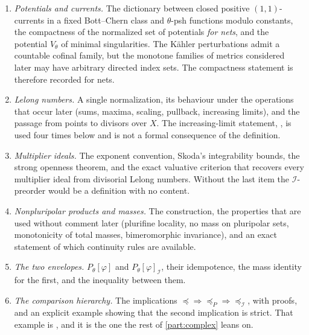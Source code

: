 \begin{enumerate}
\item\label{itm:ch51-need:currents}
      \emph{Potentials and currents.}  The dictionary between closed
      positive \((1,1)\)-currents in a fixed Bott--Chern class and
      \(\theta\)-psh functions modulo constants, the compactness of the
      normalized set of potentials \emph{for nets}, and the potential
      $V_\theta$ of minimal singularities. The K\"ahler perturbations
      admit a countable cofinal family, but the monotone families of
      metrics considered later may have arbitrary directed index sets.
      The compactness statement is therefore recorded for nets.
\item\label{itm:ch51-need:lelong}
      \emph{Lelong numbers.}  A single normalization, its behaviour under
      the operations that occur later (sums, maxima, scaling, pullback,
      increasing limits), and the passage from points to divisors over
      \(X\).  The increasing-limit statement,
      , is used four times below and is
      not a formal consequence of the definition.
\item\label{itm:ch51-need:ideals}
      \emph{Multiplier ideals.}  The exponent convention, Skoda's
      integrability bounds, the strong openness theorem, and the exact
      valuative criterion that recovers every multiplier ideal from
      divisorial Lelong numbers.  Without the last item the
      \(\mathcal I\)-preorder would be a definition with no content.
\item\label{itm:ch51-need:npp}
      \emph{Nonpluripolar products and masses.}  The construction, the
      properties that are used without comment later (plurifine locality,
      no mass on pluripolar sets, monotonicity of total masses,
      bimeromorphic invariance), and an exact statement of which
      continuity rules are available.
\item\label{itm:ch51-need:envelopes}
      \emph{The two envelopes.}  \(P_\theta[\varphi]\) and
      \(P_\theta[\varphi]_{\mathcal I}\), their idempotence, the mass
      identity for the first, and the inequality between them.
\item\label{itm:ch51-need:comparison}
      \emph{The comparison hierarchy.}  The implications
      \(\preceq\Rightarrow\preceq_P\Rightarrow\preceq_{\mathcal I}\), with
      proofs, and an explicit example showing that the second implication
      is strict.  That example is , and it is the one
      the rest of \cref{part:complex} leans on.
\end{enumerate}

